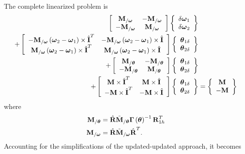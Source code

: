 \documentclass[10pt,dvips,fleqn,subeqn]{report}
\newcommand{\T}[1]{\bm{\mathbf{#1}}}
\begin{document}
The complete linearized problem is
\begin{align}
	\sqbr{\matr{cc}{
		\T{M}_{/\T{\omega}} & - \T{M}_{/\T{\omega}} \\
		- \T{M}_{/\T{\omega}} & \T{M}_{/\T{\omega}}
	}} \cubr{\cvvect{
		\delta\T{\omega}_1 \\
		\delta\T{\omega}_2
	}} & \nonumber \\
	+ \sqbr{\matr{cc}{
		- \T{M}_{/\T{\omega}} \plbr{\T{\omega}_2 - \T{\omega}_1}\times \hat{\T{I}}^T
			& - \T{M}_{/\T{\omega}} \plbr{\T{\omega}_2 - \T{\omega}_1}\times \hat{\T{I}} \\
		\T{M}_{/\T{\omega}} \plbr{\T{\omega}_2 - \T{\omega}_1}\times \hat{\T{I}}^T
			& \T{M}_{/\T{\omega}} \plbr{\T{\omega}_2 - \T{\omega}_1}\times \hat{\T{I}}
	}} \cubr{\cvvect{
		\T{\theta}_{1\delta} \\
		\T{\theta}_{2\delta}
	}} & \nonumber \\
	+ \sqbr{\matr{cc}{
		\T{M}_{/\T{\theta}} & - \T{M}_{/\T{\theta}} \\
		- \T{M}_{/\T{\theta}} & \T{M}_{/\T{\theta}}
	}} \cubr{\cvvect{
		\T{\theta}_{1\delta} \\
		\T{\theta}_{2\delta}
	}} & \nonumber \\
	+ \sqbr{\matr{cc}{
		\T{M} \times \hat{\T{I}}^T & \T{M} \times \hat{\T{I}} \\
		- \T{M} \times \hat{\T{I}}^T & - \T{M} \times \hat{\T{I}}
	}} \cubr{\cvvect{
		\T{\theta}_{1\delta} \\
		\T{\theta}_{2\delta}
	}} &= \cubr{\cvvect{
		\T{M} \\
		- \T{M}
	}}
\end{align}
where
\begin{subequations}
\begin{align}
	\T{M}_{/\T{\theta}} &= \hat{\T{R}} \tilde{\T{M}}_{/\T{\theta}} \T{\Gamma}\plbr{\T{\theta}}^{-1} \T{R}_{1h}^T \\
	\T{M}_{/\T{\omega}} &= \hat{\T{R}} \tilde{\T{M}}_{/\T{\omega}} \hat{\T{R}}^T .
\end{align}
\end{subequations}
Accounting for the simplifications of the updated-updated approach, it becomes
\end{document}
